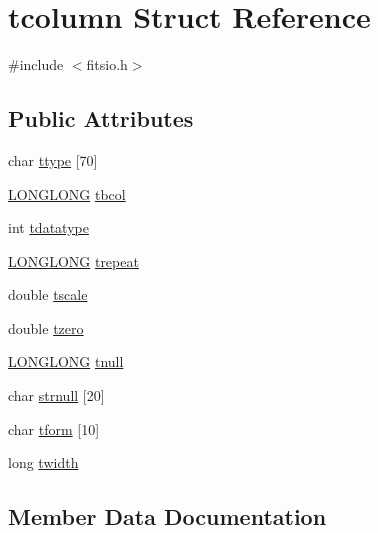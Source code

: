 \hypertarget{structtcolumn}{}\section{tcolumn Struct Reference}
\label{structtcolumn}


{\ttfamily \#include $<$fitsio.\+h$>$}

\subsection*{Public Attributes}
\begin{DoxyCompactItemize}
\item 
char \hyperlink{structtcolumn_a51109f8576b4877be4dda2fd19775614}{ttype} \mbox{[}70\mbox{]}
\item 
\hyperlink{cfortran_8h_af559a7ae68520d96f21d0655d6792508}{L\+O\+N\+G\+L\+O\+NG} \hyperlink{structtcolumn_a91d09423f2adfe0270d77085ea065350}{tbcol}
\item 
int \hyperlink{structtcolumn_af3abf7e51680994983701dc142182c4d}{tdatatype}
\item 
\hyperlink{cfortran_8h_af559a7ae68520d96f21d0655d6792508}{L\+O\+N\+G\+L\+O\+NG} \hyperlink{structtcolumn_a4d734519fdd15fc3261c374d351df0c0}{trepeat}
\item 
double \hyperlink{structtcolumn_acc57a3fa41ea199bb8bd6a231b6f6ba4}{tscale}
\item 
double \hyperlink{structtcolumn_a1116351871bcec610d1b835d6fc53b77}{tzero}
\item 
\hyperlink{cfortran_8h_af559a7ae68520d96f21d0655d6792508}{L\+O\+N\+G\+L\+O\+NG} \hyperlink{structtcolumn_aed35d391d722390693403b9c9f0649e1}{tnull}
\item 
char \hyperlink{structtcolumn_a61b28c66f4d61d57ad8158d96436d850}{strnull} \mbox{[}20\mbox{]}
\item 
char \hyperlink{structtcolumn_a142669d1f02f68877d3f87f3b0a413ca}{tform} \mbox{[}10\mbox{]}
\item 
long \hyperlink{structtcolumn_af99694f559adfc395190b82bb702b255}{twidth}
\end{DoxyCompactItemize}


\subsection{Member Data Documentation}
\mbox{\label{structtcolumn_a61b28c66f4d61d57ad8158d96436d850}} 

